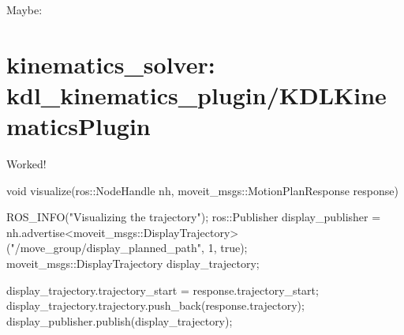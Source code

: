 Maybe\-: \section*{kinematics\-\_\-solver\-: kdl\-\_\-kinematics\-\_\-plugin/\-K\-D\-L\-Kinematics\-Plugin}

Worked! \begin{DoxyVerb}void visualize(ros::NodeHandle nh, moveit_msgs::MotionPlanResponse response) {
    ROS_INFO("Visualizing the trajectory");
    ros::Publisher display_publisher = nh.advertise<moveit_msgs::DisplayTrajectory>("/move_group/display_planned_path", 1, true);
    moveit_msgs::DisplayTrajectory display_trajectory;

    display_trajectory.trajectory_start = response.trajectory_start;
    display_trajectory.trajectory.push_back(response.trajectory);
    display_publisher.publish(display_trajectory);
}
\end{DoxyVerb}


